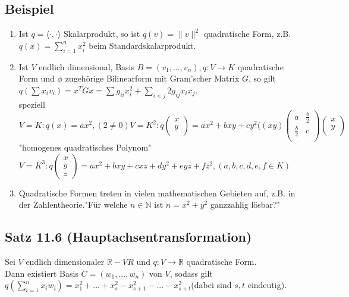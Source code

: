 \documentclass[a4paper, 12pt]{extarticle}
\newcommand{\norm}[1]{
	\parallel #1 \parallel
}
\newcommand{\skalar}[2] {
	\langle #1, #2\rangle
}
\begin{document}
\subsection*{Beispiel}
\begin{enumerate}
	\item Ist $q = \skalar{\cdot}{\cdot}$ Skalarprodukt, so ist $q(v)= \norm{v}^2$ quadratische Form, z.B. $q(x) = \sum_{i=1}^{n}x_i^2$ beim Standardskalarprodukt.
	\item Ist $V$ endlich dimensional, Basis $B=(v_1,...,v_n), q:V\longrightarrow K$ quadratische Form und $\phi$ zugehörige Bilinearform mit Gram'scher Matrix $G$, so gilt \\
	$q(\sum x_iv_i)=x^TGx = \sum g_{ii}x_i^2 + \sum_{i<j}2g_{ij}x_ix_j$.\\
	speziell $V=K: q(x) =ax^2, (2 \neq 0) V= K^2: q\left(\begin{matrix}x \\y\\ \end{matrix} \right) = ax^2 + bxy + cy^2 ((xy)\left(\begin{matrix}
		a & \frac{b}{2}\\
		\frac{b}{2} & c \\
	\end{matrix}\right) \left(\begin{matrix}
		x \\ y \\ \end{matrix}\right)$\\
	"homogenes quadratisches Polynom"$V = K^3 : q\left(\begin{matrix}x \\ y \\ z\end{matrix}\right) = ax^2 + bxy + cxz + dy^2 + eyz + fz^2, (a,b,c,d,e,f \in K)$
	\item Quadratische Formen treten in vielen mathematischen Gebieten auf, z.B. in der Zahlentheorie."Für welche $n\in \mathbb{N}$ ist $n = x^2 + y^2$ ganzzahlig lösbar?"
\end{enumerate}
\subsection*{Satz 11.6 (Hauptachsentransformation)}
Sei $V$ endlich dimensionaler $\mathbb{R} - VR$ und $q: V\longrightarrow \mathbb{R}$ quadratische Form.\\
Dann existiert Basis $C = (w_1,...,w_n)$ von $V$, sodass gilt \\
$q(\sum_{i=1}^{n}x_iw_i) = x_1^2 + ... + x_s^2 - x_{s+1}^2 - ... - x_{s+t}^2$(dabei sind $s,t$ eindeutig).
\end{document}
